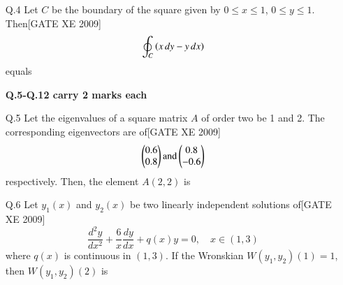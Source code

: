 \documentclass[journal,12pt,onecolumn]{IEEEtran}
\theoremstyle{remark}
\begin{document}
\begin{enumerate}
    \item[Q.4] Let $C$ be the boundary of the square given by $0 \leq x \leq 1$, $0 \leq y \leq 1$. Then\hfill[GATE XE 2009]
    $$
        \oint_C \left(x\,dy - y\,dx\right)
    $$equals
    
    \begin{enumerate}
   \end{enumerate}    
\textbf{Q.5-Q.12 carry 2 marks each}
    \item[Q.5] Let the eigenvalues of a square matrix $A$ of order two be 1 and 2. The corresponding eigenvectors are of\hfill[GATE XE 2009]
    $$
        \begin{pmatrix} 0.6 \\ 0.8\end{pmatrix}  \text{and}  \begin{pmatrix} 0.8 \\ -0.6 \end{pmatrix}
    $$
    respectively. Then, the element $A(2,2)$ is\\
    \begin{enumerate}
  \end{enumerate}      
    
    \item[Q.6] Let $y_1(x)$ and $y_2(x)$ be two linearly independent solutions of\hfill[GATE XE 2009]
    $$
        \frac{d^2 y}{dx^2} + \frac{6}{x}\frac{dy}{dx} + q(x)y = 0, \quad x \in (1,3)
    $$
    where $q(x)$ is continuous in $(1,3)$. If the Wronskian $W(y_1,y_2)(1) = 1$, then $W(y_1,y_2)(2)$ is\\
     \begin{enumerate}
\end{enumerate}      
  

\end{enumerate}
\end{document}
